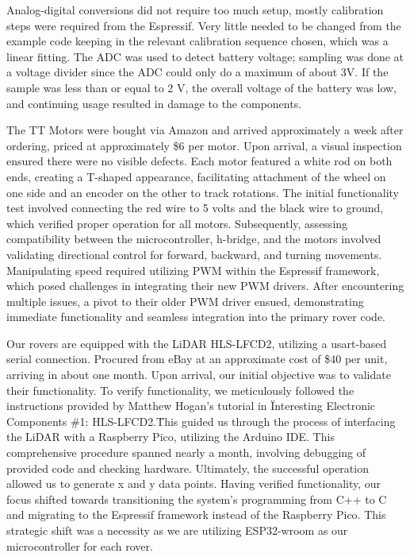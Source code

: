 \documentclass[conference]{IEEEtran}
\begin{document}
Analog-digital conversions did not require too much setup, mostly calibration steps were required from the Espressif. Very little needed to be changed from the example code keeping in the relevant calibration sequence chosen, which was a linear fitting. The ADC was used to detect battery voltage; sampling was done at a voltage divider since the ADC could only do a maximum of about 3V. If the sample was less than or equal to 2 V, the overall voltage of the battery was low, and continuing usage resulted in damage to the components.

The TT Motors were bought via Amazon and arrived approximately a week after ordering, priced at approximately \$6 per motor. Upon arrival, a visual inspection ensured there were no visible defects. Each motor featured a white rod on both ends, creating a T-shaped appearance, facilitating attachment of the wheel on one side and an encoder on the other to track rotations.
The initial functionality test involved connecting the red wire to 5 volts and the black wire to ground, which verified proper operation for all motors. Subsequently, assessing compatibility between the microcontroller, h-bridge, and the motors involved validating directional control for forward, backward, and turning movements. Manipulating speed required utilizing PWM within the Espressif framework, which posed challenges in integrating their new PWM drivers. After encountering multiple issues, a pivot to their older PWM driver ensued, demonstrating immediate functionality and seamless integration into the primary rover code.

Our rovers are equipped with the LiDAR HLS-LFCD2, utilizing a usart-based serial connection. Procured from eBay at an approximate cost of \$40 per unit, arriving in about one month. Upon arrival, our initial objective was to validate their functionality.
To verify functionality, we meticulously followed the instructions provided by Matthew Hogan's tutorial in \"Interesting Electronic Components \#1: HLS-LFCD2.\" This guided us through the process of interfacing the LiDAR with a Raspberry Pico, utilizing the Arduino IDE. This comprehensive procedure spanned nearly a month, involving debugging of provided code and checking hardware. Ultimately, the successful operation allowed us to generate x and y data points.
Having verified functionality, our focus shifted towards transitioning the system's programming from C++ to C and migrating to the Espressif framework instead of the Raspberry Pico. This strategic shift was a necessity as we are utilizing ESP32-wroom as our microcontroller for each rover.
\end{document}
